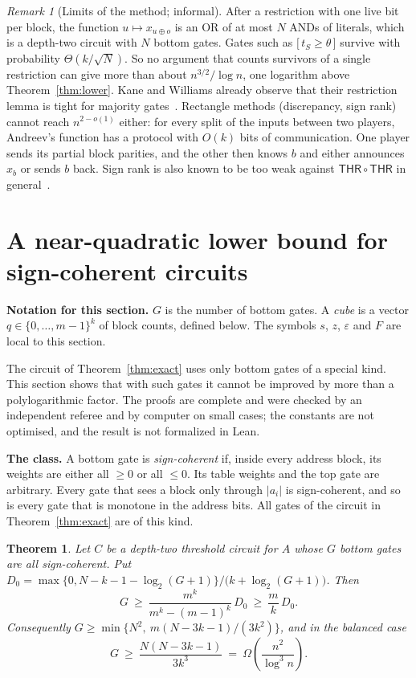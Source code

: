 \documentclass[11pt,letterpaper]{article}
\newtheorem{theorem}{Theorem}
\theoremstyle{remark}
\newtheorem*{remark}{Remark}
\newcommand{\ind}[1]{\bigl[\,#1\,\bigr]}
\newcommand{\sect}[1]{\section{\texorpdfstring{\color{ink}#1}{#1}}}
\newcommand{\smalltitle}[1]{\textbf{\color{ink}#1}\quad}
\newcommand{\THR}{\mathsf{THR}}
\begin{document}
\begin{remark}[Limits of the method; informal]
After a restriction with one live bit per block, the function
$u\mapsto x_{u\oplus o}$ is an OR of at most $N$ ANDs of literals, which is a
depth-two circuit with $N$ bottom gates. Gates such as $\ind{t_S\ge\theta}$
survive with probability $\Theta(k/\sqrt N)$. So no argument that counts
survivors of a single restriction can give more than about $n^{3/2}/\log n$,
one logarithm above Theorem~\ref{thm:lower}. Kane and Williams already observe
that their restriction lemma is tight for majority gates~\cite[Section~3]{KW}.
Rectangle methods (discrepancy, sign rank) cannot reach $n^{2-o(1)}$ either:
for every split of the inputs between two players, Andreev's function has a
protocol with $O(k)$ bits of communication. One player sends its partial
block parities, and the other then knows $b$ and either announces $x_b$ or
sends $b$ back. Sign rank is also known to be too weak against
$\THR\circ\THR$ in general~\cite{CM}.
\end{remark}

\sect{A near-quadratic lower bound for sign-coherent circuits}\label{sec:coherent}

\begin{keybox}
\textbf{Notation for this section.} $G$ is the number of bottom gates.
A \emph{cube} is a vector $q\in\{0,\dots,m-1\}^k$ of block counts, defined
below. The symbols $s$, $z$, $\varepsilon$ and $F$ are local to this section.
\end{keybox}

The circuit of Theorem~\ref{thm:exact} uses only bottom gates of a special
kind. This section shows that with such gates it cannot be improved by more
than a polylogarithmic factor. The proofs are complete and were checked by an
independent referee and by computer on small cases; the constants are not
optimised, and the result is not formalized in Lean.

\smalltitle{The class.}
A bottom gate is \emph{sign-coherent} if, inside every address block, its
weights are either all $\ge0$ or all $\le0$. Its table weights and the top
gate are arbitrary. Every gate that sees a block only through $|a_i|$ is
sign-coherent, and so is every gate that is monotone in the address bits.
All gates of the circuit in Theorem~\ref{thm:exact} are of this kind.

\begin{theorem}\label{thm:coherent}
Let $C$ be a depth-two threshold circuit for $A$ whose $G$ bottom gates are
all sign-coherent. Put $D_0=\max\{0,N-k-1-\log_2(G+1)\}/\bigl(k+\log_2(G+1)\bigr)$. Then
\[
G\ \ge\ \frac{m^k}{m^k-(m-1)^k}\,D_0\ \ge\ \frac mk\,D_0 .
\]
Consequently $G\ge\min\{N^2,\ m(N-3k-1)/(3k^2)\}$, and in the balanced case
\[
G\ \ge\ \frac{N(N-3k-1)}{3k^3}\ =\ \Omega\!\left(\frac{n^2}{\log^3 n}\right).
\]
\end{theorem}
\end{document}
